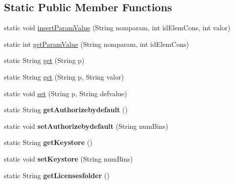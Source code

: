 \subsection*{Static Public Member Functions}
\begin{DoxyCompactItemize}
\item 
static void \hyperlink{classodrlmodel_1_1_l_d_r_config_a03eaf649f790ca3b179cbcffe94cbba6}{insert\-Param\-Value} (String nomparam, int id\-Elem\-Cons, int valor)
\item 
static int \hyperlink{classodrlmodel_1_1_l_d_r_config_a7f1ac9e32800dade8fc82a175b0717f1}{get\-Param\-Value} (String nomparam, int id\-Elem\-Cons)
\item 
static String \hyperlink{classodrlmodel_1_1_l_d_r_config_a5fc3ec8c96ab3388a637452d6badcfaf}{get} (String p)
\item 
static String \hyperlink{classodrlmodel_1_1_l_d_r_config_a08787eb61b126f83df29739b625cfdb5}{get} (String p, String valor)
\item 
static void \hyperlink{classodrlmodel_1_1_l_d_r_config_ada42c1a12fce0abe6e88371f00bdefc3}{set} (String p, String defvalue)
\item 
\hypertarget{classodrlmodel_1_1_l_d_r_config_aea1018bbe406316722f5915c4951c536}{static String {\bfseries get\-Authorizebydefault} ()}\label{classodrlmodel_1_1_l_d_r_config_aea1018bbe406316722f5915c4951c536}

\item 
\hypertarget{classodrlmodel_1_1_l_d_r_config_acd3a1eaf2162552ecbe7afd5b7daadb0}{static void {\bfseries set\-Authorizebydefault} (String num\-Bins)}\label{classodrlmodel_1_1_l_d_r_config_acd3a1eaf2162552ecbe7afd5b7daadb0}

\item 
\hypertarget{classodrlmodel_1_1_l_d_r_config_ab83adab4709644be8ddc4751cdb51d05}{static String {\bfseries get\-Keystore} ()}\label{classodrlmodel_1_1_l_d_r_config_ab83adab4709644be8ddc4751cdb51d05}

\item 
\hypertarget{classodrlmodel_1_1_l_d_r_config_adbf32274b89387ebd0d4a2d65252fd93}{static void {\bfseries set\-Keystore} (String num\-Bins)}\label{classodrlmodel_1_1_l_d_r_config_adbf32274b89387ebd0d4a2d65252fd93}

\item 
\hypertarget{classodrlmodel_1_1_l_d_r_config_a934733508d61f5b7ae0b12eb0504a60c}{static String {\bfseries get\-Licensesfolder} ()}\label{classodrlmodel_1_1_l_d_r_config_a934733508d61f5b7ae0b12eb0504a60c}


\end{DoxyCompactItemize}
